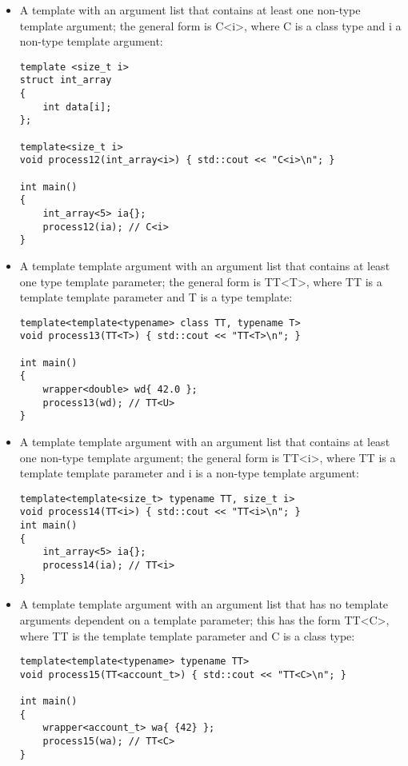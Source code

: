 \begin{itemize}
\item
A template with an argument list that contains at least one non-type template argument; the general form is C<i>, where C is a class type and i a non-type template argument:

\begin{lstlisting}[style=styleCXX]
template <size_t i>
struct int_array
{
	int data[i];
};

template<size_t i>
void process12(int_array<i>) { std::cout << "C<i>\n"; }

int main()
{
	int_array<5> ia{};
	process12(ia); // C<i>
}
\end{lstlisting}

\item
A template template argument with an argument list that contains at least one type template parameter; the general form is TT<T>, where TT is a template template parameter and T is a type template:

\begin{lstlisting}[style=styleCXX]
template<template<typename> class TT, typename T>
void process13(TT<T>) { std::cout << "TT<T>\n"; }

int main()
{
	wrapper<double> wd{ 42.0 };
	process13(wd); // TT<U>
}
\end{lstlisting}

\item
A template template argument with an argument list that contains at least one non-type template argument; the general form is TT<i>, where TT is a template template parameter and i is a non-type template argument:

\begin{lstlisting}[style=styleCXX]
template<template<size_t> typename TT, size_t i>
void process14(TT<i>) { std::cout << "TT<i>\n"; }
int main()
{
	int_array<5> ia{};
	process14(ia); // TT<i>
}
\end{lstlisting}

\item
A template template argument with an argument list that has no template arguments dependent on a template parameter; this has the form TT<C>, where TT is the template template parameter and C is a class type:

\begin{lstlisting}[style=styleCXX]
template<template<typename> typename TT>
void process15(TT<account_t>) { std::cout << "TT<C>\n"; }

int main()
{
	wrapper<account_t> wa{ {42} };
	process15(wa); // TT<C>
}
\end{lstlisting}
\end{itemize}


